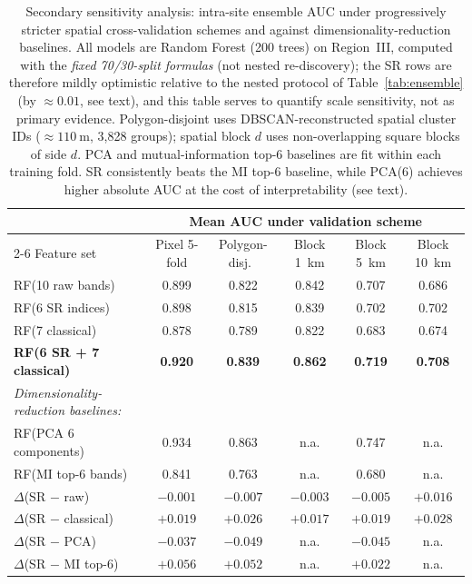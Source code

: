 \documentclass[preprint,authoryear,number]{elsarticle}
\begin{document}
\begin{table}[ht]
\centering
\caption{Secondary sensitivity analysis: intra-site ensemble AUC under progressively stricter spatial cross-validation schemes and against dimensionality-reduction baselines. All models are Random Forest (200 trees) on Region~III, computed with the \emph{fixed 70/30-split formulas} (not nested re-discovery); the SR rows are therefore mildly optimistic relative to the nested protocol of Table~\ref{tab:ensemble} (by $\approx 0.01$, see text), and this table serves to quantify scale sensitivity, not as primary evidence. Polygon-disjoint uses DBSCAN-reconstructed spatial cluster IDs ($\approx \SI{110}{\meter}$, 3{,}828 groups); spatial block $d$ uses non-overlapping square blocks of side $d$. PCA and mutual-information top-6 baselines are fit within each training fold. SR consistently beats the MI top-6 baseline, while PCA(6) achieves higher absolute AUC at the cost of interpretability (see text).}
\label{tab:spatial_robust}
\begin{tabular}{lccccc}
\toprule
 & \multicolumn{5}{c}{Mean AUC under validation scheme} \\
\cmidrule(lr){2-6}
Feature set & Pixel 5-fold & Polygon-disj.\ & Block \SI{1}{\kilo\meter} & Block \SI{5}{\kilo\meter} & Block \SI{10}{\kilo\meter} \\
\midrule
RF(10 raw bands)             & 0.899 & 0.822 & 0.842 & 0.707 & 0.686 \\
RF(6 SR indices)             & 0.898 & 0.815 & 0.839 & 0.702 & 0.702 \\
RF(7 classical)              & 0.878 & 0.789 & 0.822 & 0.683 & 0.674 \\
\textbf{RF(6 SR + 7 classical)} & \textbf{0.920} & \textbf{0.839} & \textbf{0.862} & \textbf{0.719} & \textbf{0.708} \\
\midrule
\textit{Dimensionality-reduction baselines:} & & & & & \\
RF(PCA 6 components)          & 0.934 & 0.863 & n.a. & 0.747 & n.a. \\
RF(MI top-6 bands)            & 0.841 & 0.763 & n.a. & 0.680 & n.a. \\
\midrule
$\Delta$(SR $-$ raw)                    & $-0.001$ & $-0.007$ & $-0.003$ & $-0.005$ & $+0.016$ \\
$\Delta$(SR $-$ classical)              & $+0.019$ & $+0.026$ & $+0.017$ & $+0.019$ & $+0.028$ \\
$\Delta$(SR $-$ PCA)                    & $-0.037$ & $-0.049$ & n.a.      & $-0.045$ & n.a.      \\
$\Delta$(SR $-$ MI top-6)               & $+0.056$ & $+0.052$ & n.a.      & $+0.022$ & n.a.      \\
\bottomrule
\end{tabular}
\end{table}
\end{document}
